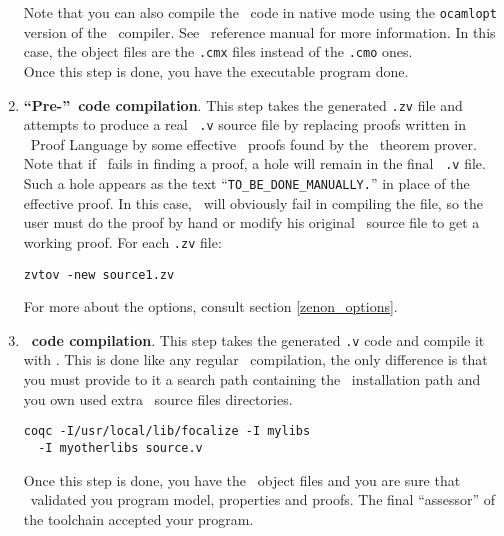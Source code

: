 \begin{enumerate}
    Note that you can also compile the \ocaml\ code in native mode
    using the {\tt ocamlopt} version of the \ocaml\ compiler. See
    \ocaml\ reference manual for more information. In this case, the
    object files are the {\tt .cmx} files instead of the {\tt .cmo}
    ones.\\
    Once this step is done, you have the executable program done.

  \item {\bf ``Pre-''\coq\ code compilation}. This step takes the
    generated {\tt .zv} file and attempts to produce a real \coq\
    {\tt .v} source file by replacing proofs written in \focal\ Proof
    Language by some effective \coq\ proofs found by the \zenon\
    theorem prover. Note that if \zenon\ fails in finding a proof, a
    hole will remain in the final \coq\ {\tt .v} file. Such a hole
    appears as the text ``{\tt TO\_BE\_DONE\_MANUALLY.}'' in place of
    the effective proof. In this case, \coq\ will obviously fail
    in compiling the file, so the user must do the proof by hand or
    modify his original \focal\ source file to get a working proof.
    For each {\tt .zv} file:
    \begin{center}
      {\tt zvtov -new source1.zv}
    \end{center}
    For more about the \zenon options, consult section
    \ref{zenon_options}.

  \item{\bf \coq\ code compilation}. This step takes the generated
    {\tt .v} code and compile it with \coq. This is done like any
    regular \coq\ compilation, the only difference is that you must
    provide to it a search path containing the \focal\ installation
    path and you own used extra \focal\ source files directories.
    \begin{verbatim}
coqc -I/usr/local/lib/focalize -I mylibs
  -I myotherlibs source.v
    \end{verbatim}
    Once this step is done, you have the \coq\ object files and you
    are sure that \coq\ validated you program model, properties and
    proofs. The final ``assessor'' of the toolchain accepted your
    program.
\end{enumerate}
